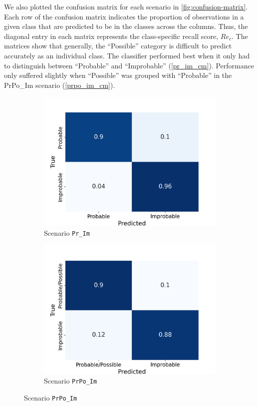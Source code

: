 \documentclass[Journal,letterpaper, SingleSpace, InsideFigs]{ascelike-new}
\begin{document}
We also plotted the confusion matrix for each scenario in \autoref{fig:confusion-matrix}.
Each row of the confusion matrix indicates the proportion of observations in a given class that are predicted to be in the classes across the columns.
Thus, the diagonal entry in each matrix represents the class-specific recall score, $Re_{c}$.
The matrices show that generally, the ``Possible'' category is difficult to predict accurately as an individual class.
The classifier performed best when it only had to distinguish between ``Probable'' and ``Improbable'' (\autoref{pr_im_cm}). Performance only suffered slightly when ``Possible'' was grouped with ``Probable'' in the PrPo\_Im scenario (\autoref{prpo_im_cm}).

\begin{figure}[ht]
  \centering
  \begin{subfigure}[t]{.4\linewidth}
    \centering
    \includegraphics[width=\linewidth, trim={0 0 1cm 1cm}, clip]{opt-confusion-matrix-Pr_Im-128-px.png}
    \caption{Scenario \texttt{Pr\_Im}}
    \label{pr_im_cm}
  \end{subfigure}%
   \begin{subfigure}[t]{.4\linewidth}
    \centering
    \includegraphics[width=\linewidth, trim={0 0 1cm 1cm}, clip]{opt-confusion-matrix-PrPo_Im-128-px.png}
    \caption{Scenario \texttt{PrPo\_Im}}
    \label{prpo_im_cm}
  \end{subfigure}%
  

\end{figure}
\end{document}
